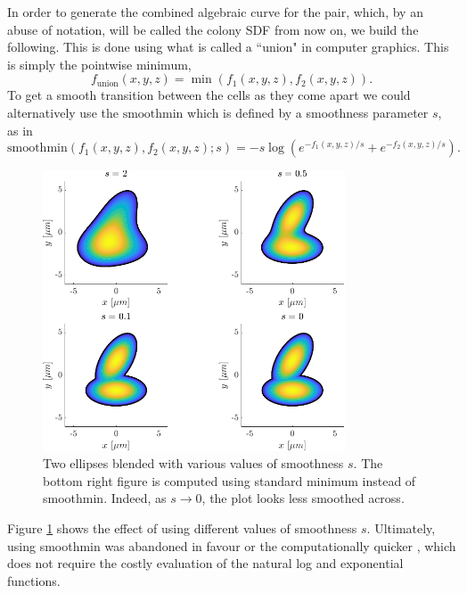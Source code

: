 In order to generate 
the combined algebraic curve for the pair, which, by an abuse of notation, will 
be called the colony SDF from now on, we build the following.
This is done using what is called a ``union" in computer graphics. 
This is simply the pointwise minimum,
\begin{equation*}
    f_{\textrm{union}}(x,y,z) = \min(f_1(x,y,z), f_2(x,y,z)).
\end{equation*} 
To get a smooth transition between the cells as they come apart we could alternatively use 
the $\textrm{smoothmin}$ which is defined by a smoothness parameter $s$, as in
\begin{equation*}
    \textrm{smoothmin}(f_1(x,y,z), f_2(x,y,z); s) = -s \log(e^{-f_1(x,y,z)/s} + e^{-f_2(x,y,z)/s}).
\end{equation*}
\begin{figure}[!htb]
    \centering
    \includegraphics[width=0.8\textwidth]{chapter2/figures/compareSmoothness.pdf}
    \caption{Two ellipses blended with various values of smoothness $s$. The bottom right 
             figure is computed using standard minimum instead of smoothmin. Indeed,
             as $s \rightarrow 0$, the plot looks less smoothed across.}
    \label{fig:compareSmoothness}
\end{figure}
Figure \ref{fig:compareSmoothness} shows the effect of using different values of smoothness
$s$. Ultimately, using smoothmin was abandoned in favour or the computationally quicker ,
which does not require the costly evaluation of the natural log and exponential functions.
\\

